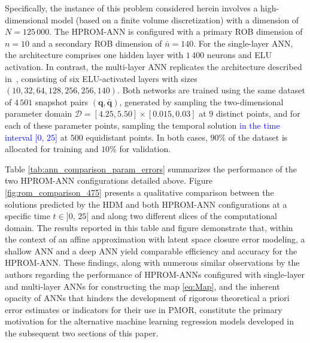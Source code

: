 \documentclass[preprint,10pt]{elsarticle}
\begin{document}
Specifically, the instance of this problem considered herein involves a high-dimensional model (based on a finite volume discretization) with a dimension of $N = 125\,000$. The 
HPROM-ANN is configured with a primary ROB dimension of $n = 10$ and a secondary ROB dimension of $\bar n = 140$. For the single-layer ANN, the architecture comprises one hidden layer with $1\,400$ neurons and ELU activation. In contrast, the multi-layer ANN replicates the architecture described in~\cite{barnett2023neural}, consisting of six ELU-activated layers 
with sizes $(10, 32, 64, 128, 256, 256, 140)$. Both networks are trained using the same dataset of $4\,501$ snapshot pairs $(\mathbf{q}, {\bar{\mathbf q}})$, generated by sampling the
two-dimensional parameter domain ${\mathcal D} = [4.25, 5.50] \times [0.015, 0.03]$ at $9$ distinct points, and for each of these parameter points, sampling the temporal solution \textcolor{blue}{in the time interval $[0,\,25$]} at $500$ equidistant points. In both cases, $90\%$ of the dataset is allocated for training and $10\%$ for validation.

Table \ref{tab:ann_comparison_param_errors} summarizes the performance of the two HPROM-ANN configurations detailed above. Figure \ref{fig:rom_comparison_475} presents a qualitative 
comparison between the solutions predicted by the HDM and both HPROM-ANN configurations at a specific time $t \in ]0, \, 25[$ and along two different slices of the computational 
domain. The results reported in this table and figure demonstrate that, within the context of an affine approximation with latent space closure error modeling, a shallow ANN and a 
deep ANN yield comparable efficiency and accuracy for the HPROM-ANN. These findings, along with numerous similar observations by the authors regarding the performance of HPROM-ANNs 
configured with single-layer and multi-layer ANNs for constructing the map \eqref{eq:Map}, and the inherent opacity of ANNs that hinders the development of rigorous theoretical a 
priori error estimates or indicators for their use in PMOR, constitute the primary motivation for the alternative machine learning regression models developed in the subsequent two 
sections of this paper.
\end{document}
